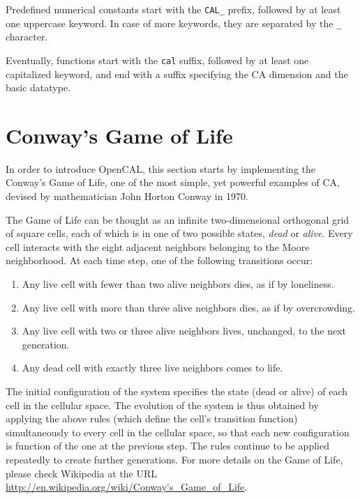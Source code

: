 Predefined numerical constants start with the \verb'CAL_' prefix,
followed by at least one uppercase keyword. In case of more keywords,
they are separated by the \verb'_' character.

Eventually, functions start with the \verb'cal' suffix, followed by at
least one capitalized keyword, and end with a suffix specifying the CA
dimension and the basic datatype.


\section{Conway's Game of Life}\label{sec:cal_life}

In order to introduce OpenCAL, this section starts by implementing the
Conway's Game of Life, one of the most simple, yet powerful examples
of CA, devised by mathematician John Horton Conway in 1970.

The Game of Life can be thought as an infinite two-dimensional
orthogonal grid of square cells, each of which is in one of two
possible states, \emph{dead} or \emph{alive}. Every cell interacts
with the eight adjacent neighbors belonging to the Moore
neighborhood. At each time step, one of the following transitions
occur:

\begin{enumerate}
    \item Any live cell with fewer than two alive neighbors dies, as
      if by loneliness.
    \item Any live cell with more than three alive neighbors dies, as
      if by overcrowding.
    \item Any live cell with two or three alive neighbors lives,
      unchanged, to the next generation.
    \item Any dead cell with exactly three live neighbors comes to
      life.
\end{enumerate}

The initial configuration of the system specifies the state (dead or
alive) of each cell in the cellular space. The evolution of the
system is thus obtained by applying the above rules (which define the
cell's transition function) simultaneously to every cell in the
cellular space, so that each new configuration is function of the one
at the previous step. The rules continue to be applied repeatedly to
create further generations. For more details on the Game of Life,
please check Wikipedia at the URL
\url{http://en.wikipedia.org/wiki/Conway's_Game_of_Life}.

